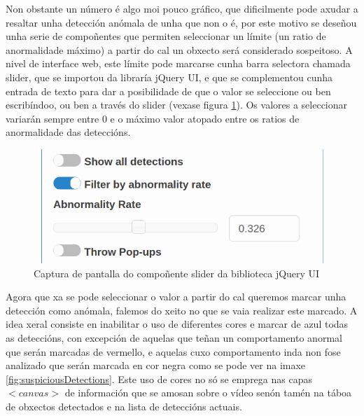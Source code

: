     Non obstante un número é algo moi pouco gráfico, que dificilmente pode axudar a resaltar unha 
    detección anómala de unha que non o é, por este motivo se deseñou unha serie de compoñentes que
    permiten seleccionar un límite (un ratio de anormalidade máximo) a partir do cal un obxecto será
    considerado sospeitoso. A nivel de interface web, este límite pode marcarse cunha barra 
    selectora chamada slider, que  se importou da libraría jQuery UI\cite{ComponenteSliderJqueryUi},
    e que se complementou cunha entrada de texto para dar a posibilidade de que o valor se seleccione
    ou ben escribíndoo, ou ben a través do slider (vexase figura \ref{fig:sliderCapture}).
    Os valores a seleccionar variarán sempre entre 0 e o máximo valor atopado entre os ratios de
    anormalidade das deteccións.

    \begin{figure}[htp]
    \begin{center}
        \includegraphics[scale=0.5]{figures/sliderCapture.png}
        \caption{Captura de pantalla do compoñente slider da biblioteca jQuery UI}
    \label{fig:sliderCapture}
    \end{center}
    \end{figure}
    
    Agora que xa se pode seleccionar o valor a partir do cal queremos marcar unha detección como
    anómala, falemos do xeito no que se vaia realizar este marcado. A idea xeral consiste en 
    inabilitar o uso de diferentes cores e marcar de azul todas as deteccións, con excepción de 
    aquelas que teñan un comportamento anormal que serán marcadas de vermello, e aquelas cuxo 
    comportamento inda non fose analizado que serán marcada en cor negra como se pode ver na imaxe
    \ref{fig:suspiciousDetections}. Este uso de cores no só
    se emprega nas capas $<canvas>$ de información que se amosan sobre o vídeo senón tamén na táboa
    de obxectos detectados e na lista de deteccións actuais.

